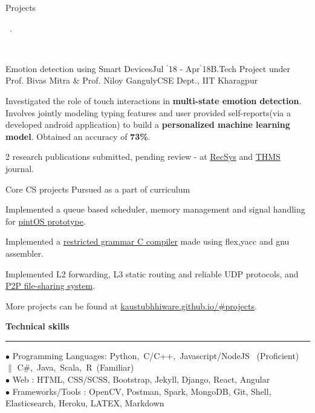 \documentclass[11pt, a4paper]{resume}
\newcommand{\important}[1]{
	\textcolor{mypurple}{#1}
}
\newcommand{\sectionTitle}[1]{
	\begin{Large}
    	\important{\textbf{#1}}
    \end{Large}
    \important{\noindent\rule{17cm}{0.4pt}} \newline
}
\newcommand{\sectionSubtitleX}[1]{
	\begin{large}
    \important{#1}
    \end{large}
}
\newcommand{\fillit}[1]{
	\leavevmode\xleaders\hbox{#1}\hfill\kern0pt
}
\begin{document}
\sectionSubtitleX{Projects} \fillit{\important{.}}
\\
\begin{rSubsection}{Emotion detection using Smart Devices}{Jul $^{\prime}$18 - 
Apr$^{\prime}$18}{B.Tech Project under Prof. Bivas Mitra \& Prof. Niloy Ganguly}{CSE Dept., 
IIT Kharagpur}
\item Investigated the role of touch interactions in {\bf multi-state emotion detection}. 
Involves jointly modeling typing features and  user provided self-reports(via a developed 
android application) to build a {\bf personalized machine learning model}. Obtained an 
accuracy of {\bf 73\%}.
\item 2 research publications submitted, pending review - at 
\href{https://recsys.acm.org/recsys18/}{RecSys} and 
\href{http://www.ieeesmc.org/publications/transactions-on-human-machine-systems}{THMS} 
journal.
\end{rSubsection}

\begin{rSubsection}{Core CS projects}{\hspace*{\fill} Pursued as a part of curriculum}{}{}
\item Implemented a queue based scheduler, memory management and signal handling for 
\href{https://github.com/kaustubhhiware/OSLab}{pintOS prototype}.
\item Implemented a \href{https://github.com/kaustubhhiware/cOMPILER}{restricted grammar C 
compiler} made using flex,yacc and gnu assembler.
\item Implemented L2 forwarding, L3 static routing and reliable UDP protocols, and 
\href{https://github.com/kaustubhhiware/fissnet}{P2P file-sharing system}.
\item More projects can be found at 
\href{https://kaustubhhiware.github.io/#projects}{kaustubhhiware.github.io/\#projects}.
\end{rSubsection}


\sectionTitle{Technical skills}
$\bullet$ Programming Languages: Python,\, C/C++,\, Javascript/NodeJS \, (Proficient)\, $\|$ 
C\#,\, Java,\, Scala,\, R\, (Familiar) \\
$\bullet$ Web : HTML, CSS/SCSS, Bootstrap, Jekyll, Django, React, Angular \\
$\bullet$  Frameworks/Tools
: OpenCV, Postman, Spark, MongoDB, Git, Shell, Elasticsearch, Heroku, LATEX, Markdown
\end{document}
